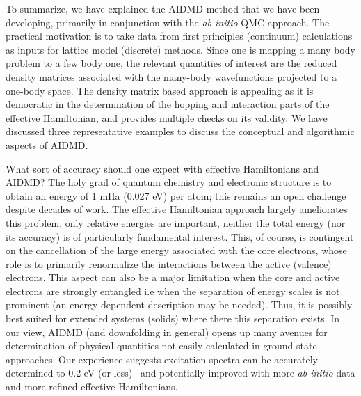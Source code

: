 \documentclass[prl,12pt,onecolumn,nofootinbib,notitlepage,english,superscriptaddress]{revtex4-1}
\begin{document}
To summarize, we have explained the AIDMD method that we have been developing, primarily in conjunction with the 
\emph{ab-initio} QMC approach. The practical motivation is to take data from first principles (continuum) 
calculations as inputs for lattice model (discrete) methods. 
Since one is mapping a many body problem to a few body one, the relevant quantities of interest are 
the reduced density matrices associated with the many-body wavefunctions projected to a one-body space. 
The density matrix based approach is appealing as it is democratic 
in the determination of the hopping and interaction parts of the effective Hamiltonian, and provides multiple 
checks on its validity. We have discussed three representative examples to discuss the conceptual and algorithmic aspects of AIDMD. 

What sort of accuracy should one expect with effective Hamiltonians and AIDMD? The holy grail of quantum chemistry 
and electronic structure is to obtain an energy of 1 mHa (0.027 eV) per atom; this 
remains an open challenge despite decades of work. The effective Hamiltonian approach largely ameliorates this problem,  only 
relative energies are important, neither the total energy (nor its accuracy) is of particularly 
fundamental interest. This, of course, is contingent on the cancellation of the large energy associated with the core electrons, 
whose role is to primarily renormalize the interactions between the active (valence) electrons. This aspect can also 
be a major limitation when the core and active electrons are strongly entangled i.e when the separation of energy 
scales is not prominent (an energy dependent description may be needed). 
Thus, it is possibly best suited for extended systems (solids) where there this separation exists. 
In our view, AIDMD (and downfolding in general) opens up many avenues for determination of physical 
quantities not easily calculated in ground state approaches. Our experience suggests excitation spectra 
can be accurately determined to 0.2 eV (or less)~\cite{Changlani2015} and potentially improved with 
more \emph{ab-initio} data and more refined effective Hamiltonians.  
\end{document}
